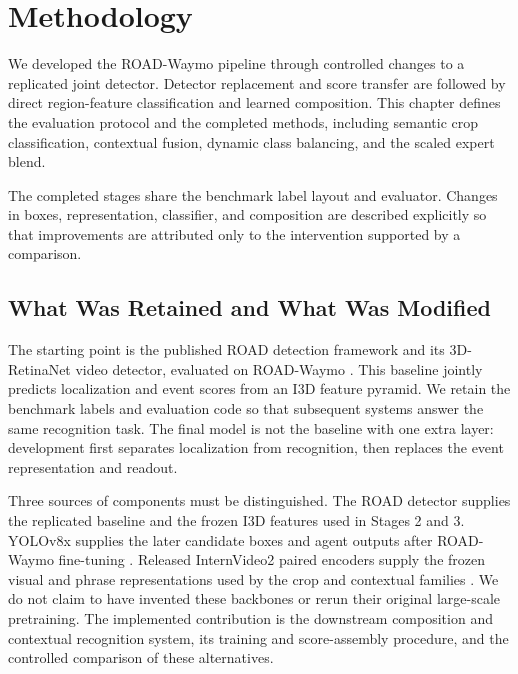 \chapter{Methodology}

We developed the ROAD-Waymo pipeline through controlled changes to a replicated joint detector. Detector replacement and score transfer are followed by direct region-feature classification and learned composition. This chapter defines the evaluation protocol and the completed methods, including semantic crop classification, contextual fusion, dynamic class balancing, and the scaled expert blend.

The completed stages share the benchmark label layout and evaluator. Changes in boxes, representation, classifier, and composition are described explicitly so that improvements are attributed only to the intervention supported by a comparison.

\section{What Was Retained and What Was Modified}
\label{sec:baseline-modifications}

The starting point is the published ROAD detection framework and its 3D-RetinaNet video detector, evaluated on ROAD-Waymo \cite{road,road-waymo}. This baseline jointly predicts localization and event scores from an I3D feature pyramid. We retain the benchmark labels and evaluation code so that subsequent systems answer the same recognition task. The final model is not the baseline with one extra layer: development first separates localization from recognition, then replaces the event representation and readout.

Three sources of components must be distinguished. The ROAD detector supplies the replicated baseline and the frozen I3D features used in Stages 2 and 3. YOLOv8x supplies the later candidate boxes and agent outputs after ROAD-Waymo fine-tuning \cite{yolov8}. Released InternVideo2 paired encoders supply the frozen visual and phrase representations used by the crop and contextual families \cite{internvideo2,internvideo2-clip-s}. We do not claim to have invented these backbones or rerun their original large-scale pretraining. The implemented contribution is the downstream composition and contextual recognition system, its training and score-assembly procedure, and the controlled comparison of these alternatives.

